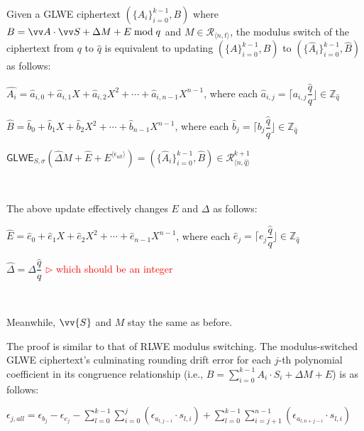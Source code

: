 \begin{tcolorbox}[title={\textbf{\tboxlabel{\ref*{subsec:modulus-switch-glwe}} GLWE Modulus Switching}}]

Given a GLWE ciphertext $(\{A_i\}_{i=0}^{k-1}, B)$ where $B = \vv A\cdot \vv S + \Delta M + E \bmod q$ and $M \in \mathcal{R}_{\langle n, t \rangle}$, the modulus switch of the ciphertext from $q$ to $\hat q$ is equivalent to updating $(\{A\}_{i=0}^{k-1}, B)$ to $(\{\hat{A}_i\}_{i=0}^{k-1}, \hat B)$ as follows:


$\hat{A_i} = \hat{a}_{i,0} + \hat{a}_{i,1}X + \hat{a}_{i,2}X^2 + \cdots + \hat{a}_{i, {n-1}}X^{n-1}$, where each $\hat{a}_{i,j} = \Big\lceil a_{i,j}\dfrac{\hat{q}}{q} \Big\rfloor \in \mathbb{Z}_{\hat{q}}$ 


$\hat{B} = \hat{b}_0 + \hat{b}_1X + \hat{b}_2X^2 + \cdots + \hat{b}_{n-1}X^{n-1}$, where each $\hat{b}_j = \Big\lceil b_j\dfrac{\hat{q}}{q} \Big\rfloor \in \mathbb{Z}_{\hat{q}}$

$\textsf{GLWE}_{{S},\sigma}(\hat{\Delta}  M + \hat{E} + E^{\langle \epsilon_{\textit{all}} \rangle}) = (\{\hat{A}_i\}_{i=0}^{k-1}, \hat{B}) \in \mathcal{R}_{\langle n, \hat{q} \rangle}^{k+1}$ 

$ $

The above update effectively changes $E$ and $\Delta$ as follows:

$\hat{E} = \hat{e}_0 + \hat{e}_1X + \hat{e}_2X^2 + \cdots + \hat{e}_{n-1}X^{n-1}$, where each $\hat{e}_j = \Big\lceil e_j\dfrac{\hat{q}}{q} \Big\rfloor \in \mathbb{Z}_{\hat{q}}$


$\hat{\Delta} = \Delta\dfrac{\hat{q}}{q}$ \textcolor{red}{ $\rhd$ which should be an integer}

$ $


Meanwhile, $\vv{S}$ and $M$ stay the same as before.



\end{tcolorbox}

The proof is similar to that of RLWE modulus switching. The modulus-switched GLWE ciphertext's culminating rounding drift error for each $j$-th polynomial coefficient in its congruence relationship (i.e., $B = \sum\limits_{i=0}^{k-1}A_i\cdot S_i + \Delta M + E$) is as follows:

$\epsilon_{j, all} = \epsilon_{b_j} - \epsilon_{e_j}
- \sum\limits_{l=0}^{k-1}\sum\limits_{i=0}^{j}(\epsilon_{a_{l,j-i}} \cdot s_{l,i})
+ \sum\limits_{l=0}^{k-1}\sum\limits_{i=j+1}^{n-1}(\epsilon_{a_{l,n+j-i}} \cdot s_{l,i})$

